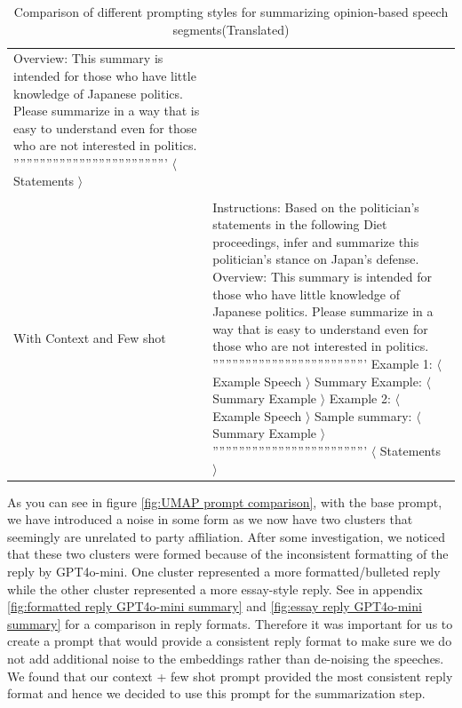 \documentclass[final,5p,times,twocolumn,authoryear]{elsarticle}
\begin{document}
\begin{table}[htbp]
\begin{tabularx}{.45\textwidth}{ p{1.7cm}|X }
Overview:
\newline
This summary is intended for those who have little knowledge of Japanese politics. Please summarize in a way that is easy to understand even for those who are not interested in politics.
'''''''''''''''''''''''''''''''''''''''''''''''
\newline
$\langle$ Statements $\rangle$ \\ \\ 
\hline
With Context and Few shot  & Instructions:
\newline
Based on the politician's statements in the following Diet proceedings, infer and summarize this politician's stance on Japan's defense. 
\newline
Overview:
\newline
This summary is intended for those who have little knowledge of Japanese politics. Please summarize in a way that is easy to understand even for those who are not interested in politics.
'''''''''''''''''''''''''''''''''''''''''''''''
\newline
Example 1:
\newline
$\langle$ Example Speech $\rangle$
\newline
Summary Example:
\newline
$\langle$ Summary Example $\rangle$
\newline
Example 2:
\newline
$\langle$ Example Speech $\rangle$
\newline
Sample summary:
\newline
$\langle$ Summary Example $\rangle$
\newline
'''''''''''''''''''''''''''''''''''''''''''''''
\newline
$\langle$ Statements $\rangle$ \\
\hline
\end{tabularx}
\caption{Comparison of different prompting styles for summarizing opinion-based speech segments(Translated)}
\label{tab:summary prompt styles}
\end{table}

As you can see in figure \ref{fig:UMAP prompt comparison}, with the base prompt, we have introduced a noise in some form as we now have two clusters that seemingly are unrelated to party affiliation. After some investigation, we noticed that these two clusters were formed because of the inconsistent formatting of the reply by GPT4o-mini. One cluster represented a more formatted/bulleted reply while the other cluster represented a more essay-style reply. See in appendix \ref{fig:formatted reply GPT4o-mini summary} and \ref{fig:essay reply GPT4o-mini summary} for a comparison in reply formats. Therefore it was important for us to create a prompt that would provide a consistent reply format to make sure we do not add additional noise to the embeddings rather than de-noising the speeches. We found that our context + few shot prompt provided the most consistent reply format and hence we decided to use this prompt for the summarization step.
\end{document}

